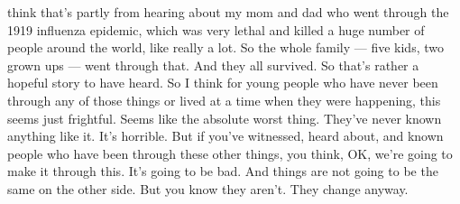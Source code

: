 \begin{itemize}
  think that's partly from hearing about my mom and dad who went through
  the 1919 influenza epidemic, which was very lethal and killed a huge
  number of people around the world, like really a lot. So the whole
  family --- five kids, two grown ups --- went through that. And they
  all survived. So that's rather a hopeful story to have heard. So I
  think for young people who have never been through any of those things
  or lived at a time when they were happening, this seems just
  frightful. Seems like the absolute worst thing. They've never known
  anything like it. It's horrible. But if you've witnessed, heard about,
  and known people who have been through these other things, you think,
  OK, we're going to make it through this. It's going to be bad. And
  things are not going to be the same on the other side. But you know
  they aren't. They change anyway.


\end{itemize}
